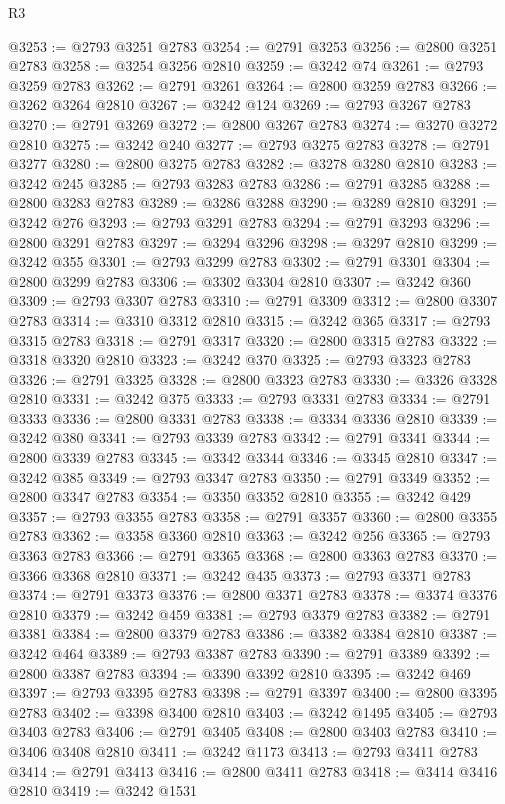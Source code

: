 \begin{lexlean}{R3}
\begin{coremodule}
@3253 := @2793 @3251 @2783
@3254 := @2791 @3253
@3256 := @2800 @3251 @2783
@3258 := @3254 @3256 @2810
@3259 := @3242 @74
@3261 := @2793 @3259 @2783
@3262 := @2791 @3261
@3264 := @2800 @3259 @2783
@3266 := @3262 @3264 @2810
@3267 := @3242 @124
@3269 := @2793 @3267 @2783
@3270 := @2791 @3269
@3272 := @2800 @3267 @2783
@3274 := @3270 @3272 @2810
@3275 := @3242 @240
@3277 := @2793 @3275 @2783
@3278 := @2791 @3277
@3280 := @2800 @3275 @2783
@3282 := @3278 @3280 @2810
@3283 := @3242 @245
@3285 := @2793 @3283 @2783
@3286 := @2791 @3285
@3288 := @2800 @3283 @2783
@3289 := @3286 @3288
@3290 := @3289 @2810
@3291 := @3242 @276
@3293 := @2793 @3291 @2783
@3294 := @2791 @3293
@3296 := @2800 @3291 @2783
@3297 := @3294 @3296
@3298 := @3297 @2810
@3299 := @3242 @355
@3301 := @2793 @3299 @2783
@3302 := @2791 @3301
@3304 := @2800 @3299 @2783
@3306 := @3302 @3304 @2810
@3307 := @3242 @360
@3309 := @2793 @3307 @2783
@3310 := @2791 @3309
@3312 := @2800 @3307 @2783
@3314 := @3310 @3312 @2810
@3315 := @3242 @365
@3317 := @2793 @3315 @2783
@3318 := @2791 @3317
@3320 := @2800 @3315 @2783
@3322 := @3318 @3320 @2810
@3323 := @3242 @370
@3325 := @2793 @3323 @2783
@3326 := @2791 @3325
@3328 := @2800 @3323 @2783
@3330 := @3326 @3328 @2810
@3331 := @3242 @375
@3333 := @2793 @3331 @2783
@3334 := @2791 @3333
@3336 := @2800 @3331 @2783
@3338 := @3334 @3336 @2810
@3339 := @3242 @380
@3341 := @2793 @3339 @2783
@3342 := @2791 @3341
@3344 := @2800 @3339 @2783
@3345 := @3342 @3344
@3346 := @3345 @2810
@3347 := @3242 @385
@3349 := @2793 @3347 @2783
@3350 := @2791 @3349
@3352 := @2800 @3347 @2783
@3354 := @3350 @3352 @2810
@3355 := @3242 @429
@3357 := @2793 @3355 @2783
@3358 := @2791 @3357
@3360 := @2800 @3355 @2783
@3362 := @3358 @3360 @2810
@3363 := @3242 @256
@3365 := @2793 @3363 @2783
@3366 := @2791 @3365
@3368 := @2800 @3363 @2783
@3370 := @3366 @3368 @2810
@3371 := @3242 @435
@3373 := @2793 @3371 @2783
@3374 := @2791 @3373
@3376 := @2800 @3371 @2783
@3378 := @3374 @3376 @2810
@3379 := @3242 @459
@3381 := @2793 @3379 @2783
@3382 := @2791 @3381
@3384 := @2800 @3379 @2783
@3386 := @3382 @3384 @2810
@3387 := @3242 @464
@3389 := @2793 @3387 @2783
@3390 := @2791 @3389
@3392 := @2800 @3387 @2783
@3394 := @3390 @3392 @2810
@3395 := @3242 @469
@3397 := @2793 @3395 @2783
@3398 := @2791 @3397
@3400 := @2800 @3395 @2783
@3402 := @3398 @3400 @2810
@3403 := @3242 @1495
@3405 := @2793 @3403 @2783
@3406 := @2791 @3405
@3408 := @2800 @3403 @2783
@3410 := @3406 @3408 @2810
@3411 := @3242 @1173
@3413 := @2793 @3411 @2783
@3414 := @2791 @3413
@3416 := @2800 @3411 @2783
@3418 := @3414 @3416 @2810
@3419 := @3242 @1531

\end{coremodule}
\end{lexlean}
